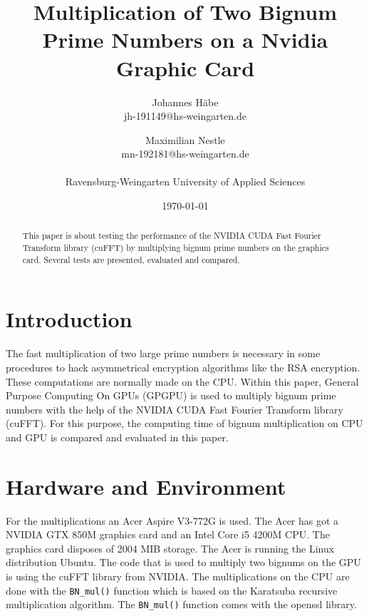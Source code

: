 \documentclass[12pt,a4paper]{article}
\title{Multiplication of Two Bignum Prime Numbers on a Nvidia Graphic Card}
\author{Johannes H\"abe  \\
	jh-191149@hs-weingarten.de
	\and 
	Maximilian Nestle \\
	mn-192181@hs-weingarten.de \\\\
	Ravensburg-Weingarten University of Applied Sciences
	}
\date{\today}
\begin{document}
\maketitle
%
\begin{abstract}
This paper is about testing the performance of the NVIDIA CUDA Fast Fourier Transform library (cuFFT) by multiplying bignum prime numbers on the graphics card. Several tests are presented, evaluated and compared.
\end{abstract}

\section{Introduction}
The fast multiplication of two large prime numbers is necessary in some procedures to hack asymmetrical encryption algorithms like the RSA encryption. These computations are normally made on the CPU. Within this paper, General Purpose Computing On GPUs (GPGPU) is used to multiply bignum prime numbers with the help of the NVIDIA CUDA Fast Fourier Transform library (cuFFT). For this purpose, the computing time of bignum multiplication on CPU and GPU is compared and evaluated in this paper.

\section{Hardware and Environment}
For the multiplications an Acer Aspire V3-772G is used. The Acer has got a NVIDIA GTX 850M graphics card and an Intel Core i5 4200M CPU. The graphics card disposes of 2004 MIB storage. The Acer is running the Linux distribution Ubuntu. The code that is used to multiply two bignums on the GPU is using the cuFFT library from NVIDIA. The multiplications on the CPU are done with the \texttt{BN_mul()} function which is based on the Karatsuba recursive multiplication algorithm. The \texttt{BN_mul()} function comes with the openssl library.
\end{document}
